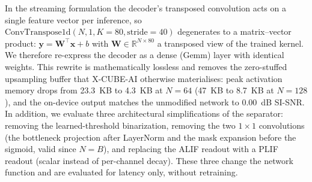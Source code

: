 In the streaming formulation the decoder's transposed convolution acts on a
single feature vector per inference, so
$\mathrm{ConvTranspose1d}(N,1,K{=}80,\mathrm{stride}{=}40)$ degenerates to a
matrix--vector product: $\mathbf{y} = \mathbf{W}^{\top}\mathbf{x} + b$ with
$\mathbf{W} \in \mathbb{R}^{N\times80}$ a transposed view of the trained
kernel. We therefore re-express the decoder as a dense (Gemm) layer with
identical weights. This rewrite is mathematically lossless and removes the
zero-stuffed upsampling buffer that X-CUBE-AI otherwise materialises: peak
activation memory drops from 23.3~KB to 4.3~KB at $N{=}64$ (47~KB to 8.7~KB
at $N{=}128$), and the on-device output matches the unmodified network to
$0.00$~dB SI-SNR. In addition, we evaluate three architectural
simplifications of the separator: removing the learned-threshold
binarization, removing the two $1\times1$ convolutions (the bottleneck
projection after LayerNorm and the mask expansion before the sigmoid, valid
since $N{=}B$), and replacing the ALIF readout with a PLIF readout (scalar
instead of per-channel decay). These three change the network function and
are evaluated for latency only, without retraining.

